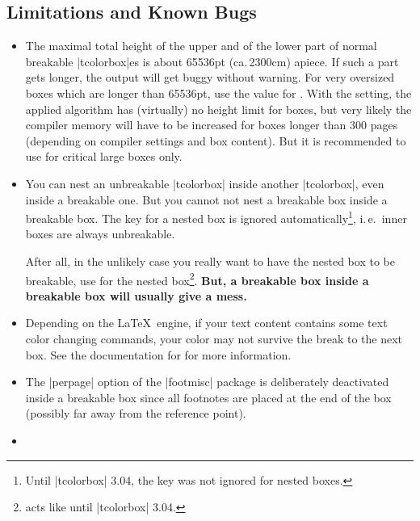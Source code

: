 \subsection{Limitations and Known Bugs}
\begin{itemize}
\item  The maximal total height of the upper and of the lower part
  of normal breakable |tcolorbox|es is about 65536pt (ca.\,2300cm)
  apiece. If such a part gets longer, the output will get buggy
  without warning.
  For very oversized boxes which are longer than 65536pt, use
  the  value for  .
  With the  setting,
  the applied algorithm has (virtually) no height limit for boxes, but
  very likely the compiler memory will have to be increased for boxes longer
  than 300 pages (depending on compiler settings and box content).
  But it is recommended to use  for critical large boxes only.
\item You can nest an unbreakable |tcolorbox| inside another |tcolorbox|,
  even inside a breakable one.
  But you cannot not nest a breakable box inside a breakable box.
  The  key for a nested box is ignored
  automatically\footnote{Until |tcolorbox| 3.04, the  key
  was not ignored for nested boxes.}, i.\,e.\ inner
  boxes are always unbreakable.\par
  After all, in the unlikely case you really want to have the nested box to be breakable,
  use  for the nested
  box\footnote{ acts like  until |tcolorbox| 3.04.}.
  \textbf{But, a breakable box inside a breakable box will usually give a mess.}
\item{}
  Depending on the \LaTeX\ engine, if your text content contains some text
  color changing commands, your color may not survive the break to the next box.
  See the documentation for  for more information.
\item{}
  The |perpage| option of the |footmisc| package is deliberately deactivated
  inside a breakable box since all footnotes are placed at the end
  of the box (possibly far away from the reference point).
\item{}

\end{itemize}
